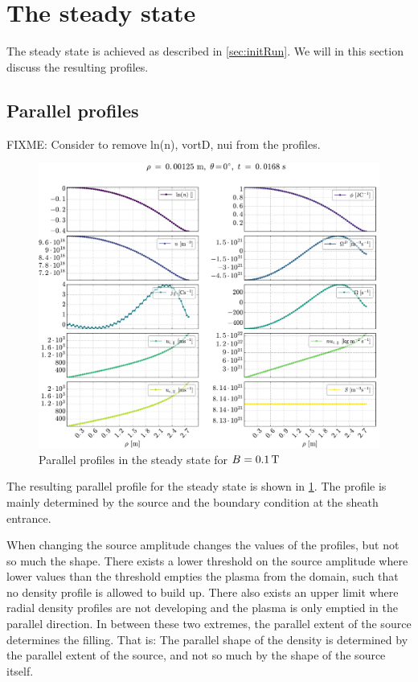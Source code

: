 \section{The steady state}
%
The steady state is achieved as described in \cref{sec:initRun}.
We will in this section discuss the resulting profiles.

\subsection{Parallel profiles}

FIXME: Consider to remove ln(n), vortD, nui from the profiles.

%
\begin{figure}[htb]
    \centering
    \includegraphics[width=1.0\textwidth]{fig/results/1DProfiles/B010Par}
    \caption{Parallel profiles in the steady state for $B=0.1\, \text{T}$}
    \label{fig:parProfs}
\end{figure}
%
The resulting parallel profile for the steady state is shown in \cref{fig:parProfs}.
The profile is mainly determined by the source and the boundary condition at the sheath entrance.

When changing the source amplitude changes the values of the profiles, but not so much the shape.
There exists a lower threshold on the source amplitude where lower values than the threshold empties the plasma from the domain, such that no density profile is allowed to build up.
There also exists an upper limit where radial density profiles are not developing and the plasma is only emptied in the parallel direction.
In between these two extremes, the parallel extent of the source determines the filling.
That is: The parallel shape of the density is determined by the parallel extent of the source, and not so much by the shape of the source itself.

